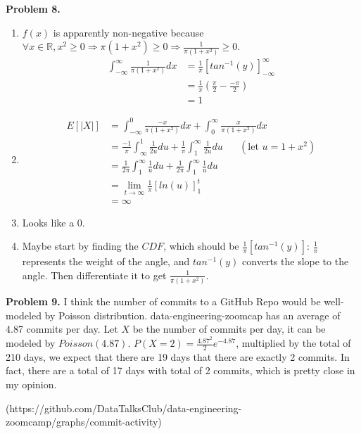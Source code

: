 \documentclass{article}
\begin{document}
\textbf{Problem 8.}
\begin{enumerate}[label={(\alph*)}]
    \item 
    $f(x)$ is apparently non-negative because $\forall x \in \mathbb{R}, x^2 \ge 0 \Rightarrow \pi(1+x^2) \ge 0 \Rightarrow \frac{1}{\pi(1+x^2)} \ge 0$.
    \begin{align}
        \int_{-\infty}^{\infty}\frac{1}{\pi(1+x^2)}dx & = \frac{1}{\pi}\left[tan^{-1}(y)\right]_{-\infty}^{\infty} \\
        & = \frac{1}{\pi}\left(\frac{\pi}{2}-\frac{-\pi}{2}\right) \\
        & = 1
    \end{align}

    \item 
    \begin{align}
        E[|X|] & = \int_{-\infty}^{0}\frac{-x}{\pi(1+x^2)}dx + \int_{0}^{\infty}\frac{x}{\pi(1+x^2)}dx \\
        & = \frac{-1}{\pi}\int_{\infty}^{1}\frac{1}{2u}du + \frac{1}{\pi}\int_{1}^{\infty}\frac{1}{2u}du \;\;\;\;\;\; \left(\text{let } u = 1+x^2\right)\\
        & = \frac{1}{2\pi} \int_{1}^{\infty}\frac{1}{u}du + \frac{1}{2\pi} \int_{1}^{\infty}\frac{1}{u}du \\
        & = \lim_{t \rightarrow \infty}\frac{1}{\pi} \left[ln(u)\right]_1^{t} \\
        & = \infty
    \end{align}

    \item Looks like a 0.
    
    \item Maybe start by finding the $CDF$, which should be $\frac{1}{\pi}\left[tan^{-1}(y)\right]$: $\frac{1}{\pi}$ represents the weight of the angle, and $tan^{-1}(y)$ converts the slope to the angle. 
    Then differentiate it to get $\frac{1}{\pi(1+x^2)}$.
\end{enumerate}
\bigbreak

\textbf{Problem 9.} I think the number of commits to a GitHub Repo would be well-modeled by Poisson distribution.
data-engineering-zoomcap has an average of 4.87 commits per day. Let $X$ be the number of commits per day, it can be modeled by $Poisson(4.87)$. 
$P(X=2) = \frac{4.87^2}{2}e^{-4.87}$, multiplied by the total of 210 days, we expect that there are 19 days that there are exactly 2 commits.
In fact, there are a total of 17 days with total of 2 commits, which is pretty close in my opinion.


(https://github.com/DataTalksClub/data-engineering-zoomcamp/graphs/commit-activity)
\end{document}
